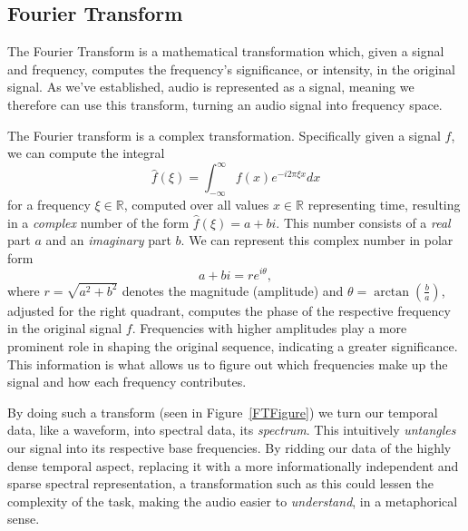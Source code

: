 \subsection{Fourier Transform}

The Fourier Transform is a mathematical transformation which, given a signal and frequency, computes the frequency's significance, or intensity, in the original signal. As we've established, audio is represented as a signal, meaning we therefore can use this transform, turning an audio signal into frequency space. 

The Fourier transform is a complex transformation. Specifically given a signal $f$, we can compute the integral \[ \widehat{f}(\xi) = \int^{\infty}_{-\infty}{f(x)e^{-i2\pi \xi x} dx} \] for a frequency $\xi \in \mathbb{R}$, computed over all values $x \in \mathbb{R}$ representing time, resulting in a \textit{complex} number of the form $\widehat{f}(\xi) = a + bi$. This number consists of a \textit{real} part $a$ and an \textit{imaginary} part $b$. We can represent this complex number in polar form \[ a + bi = re^{i\theta}, \] where $r = \sqrt{a^2 + b^2}$ denotes the magnitude (amplitude) and $\theta = \arctan{(\frac{b}{a})}$, adjusted for the right quadrant, computes the phase of the respective frequency in the original signal $f$. Frequencies with higher amplitudes play a more prominent role in shaping the original sequence, indicating a greater significance. This information is what allows us to figure out which frequencies make up the signal and how each frequency contributes. 

By doing such a transform (seen in Figure~\ref{FTFigure}) we turn our temporal data, like a waveform, into spectral data, its \textit{spectrum}. This intuitively \textit{untangles} our signal into its respective base frequencies. By ridding our data of the highly dense temporal aspect, replacing it with a more informationally independent and sparse spectral representation, a transformation such as this could lessen the complexity of the task, making the audio easier to \textit{understand}, in a metaphorical sense.

